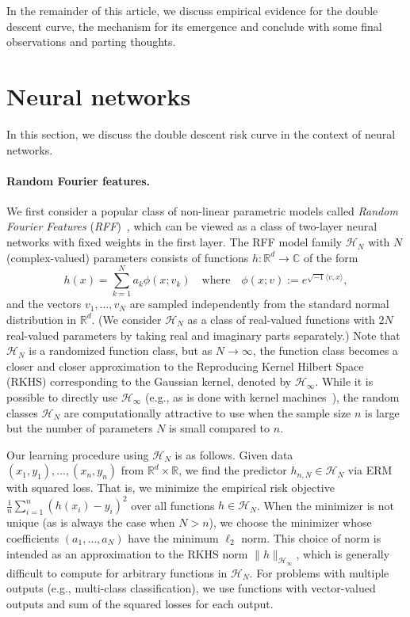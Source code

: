 \documentclass[11pt]{article}
\newcommand{\R}{{\mathbb{R}}}
\newcommand{\cHN}{{\mathcal{H}_N}}
\newcommand{\rkhs}{{\mathcal{H_\infty}}}
\newcommand\optnN{h_{n,N}}
\begin{document}
In the remainder of this article, we discuss empirical evidence for the double descent curve, the mechanism for its emergence and conclude with some final observations and parting thoughts.



\section{Neural networks}
\label{sec:RFF+NN}

In this section, we discuss the double descent risk curve in the context of neural networks.

\paragraph{Random Fourier features.}

We first consider a popular class of non-linear parametric models called \emph{Random Fourier Features} (\emph{RFF})~\cite{rahimi2008random}, which can be viewed as a  class of two-layer neural networks with fixed weights in the first layer.
The RFF model family $\cHN$ with $N$ (complex-valued) parameters consists of functions $h \colon \R^d \to \mathbb{C}$ of the form
\[
  h(x) = \sum_{k=1}^N a_k \phi(x; v_k)
  \quad\text{where}\quad
  \phi(x; v) := e^{\sqrt{-1} \langle v,x \rangle} ,
\]
and the vectors $v_1,\dotsc,v_N$ are sampled independently from the standard normal distribution in $\R^d$.
(We consider $\cHN$ as a class of real-valued functions with $2N$ real-valued parameters by taking real and imaginary parts separately.)
Note that $\cHN$ is a randomized function class, but as $N \to \infty$, the function class becomes a closer and closer approximation to the Reproducing Kernel Hilbert Space (RKHS) corresponding to the Gaussian kernel, denoted by $\rkhs$.
While it is possible to directly use $\rkhs$ (e.g., as is done with kernel machines~\cite{boser1992training}), the random classes $\cHN$ are computationally attractive to use when the sample size $n$ is large but the number of parameters $N$ is small compared to $n$.

Our learning procedure using $\cHN$ is as follows.
Given data $(x_1,y_1),\dotsc,(x_n,y_n)$ from $\R^d \times \R$, we find the predictor $\optnN \in \cHN$ via ERM with squared loss.
That is, we minimize the empirical risk objective $\tfrac1n \sum_{i=1}^n (h(x_i) - y_i)^2$ over all functions $h \in \cHN$.
When the minimizer is not unique (as is always the case when $N>n$), we choose the minimizer whose coefficients $(a_1,\dotsc,a_N)$ have the minimum $\ell_2$ norm.
This choice of norm is intended as an approximation to the RKHS norm $\|h\|_{\rkhs}$, which is generally difficult to compute for arbitrary functions in $\cHN$.
For problems with multiple outputs (e.g., multi-class classification), we use functions with vector-valued outputs and sum of the squared losses for each output.
\end{document}
